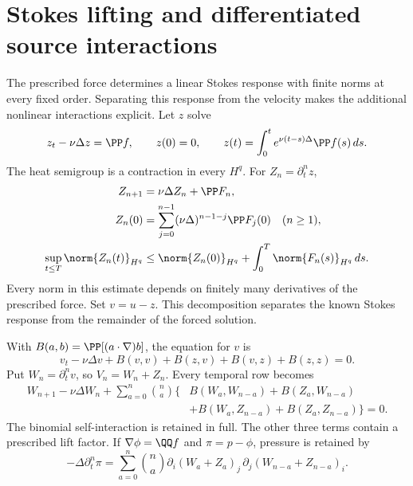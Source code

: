 \section{Stokes lifting and differentiated source interactions}\label{r:joined-sec:unrestricted}

The prescribed force determines a linear Stokes response with
finite norms at every fixed order. Separating this response from the
velocity makes the additional nonlinear interactions explicit.
Let $z$ solve
\begin{equation}\label{r:joined-eq:stokeslift}
z_t-\nu\Delta z=\PP f,\qquad z(0)=0,
\qquad z(t)=\int_0^t e^{\nu(t-s)\Delta}\PP f(s)\,ds.
\end{equation}
The heat semigroup is a contraction in every $H^q$. For $Z_n=\partial_t^nz$,
\begin{equation}\label{r:joined-eq:liftjets}
\begin{aligned}
Z_{n+1}&=\nu\Delta Z_n+\PP F_n,\\
Z_n(0)&=\sum_{j=0}^{n-1}(\nu\Delta)^{n-1-j}\PP F_j(0)
\quad(n\ge1),\\
\sup_{t\le T}\norm{Z_n(t)}_{H^q}
&\le\norm{Z_n(0)}_{H^q}+\int_0^T\norm{F_n(s)}_{H^q}\,ds.
\end{aligned}
\end{equation}
Every norm in this estimate depends on finitely many derivatives of
the prescribed force. Set \(v=u-z\). This decomposition separates the
known Stokes response from the remainder of the forced solution.

With $B(a,b)=\PP[(a\cdot\nabla)b]$, the equation for $v$ is
\begin{equation}\label{r:joined-eq:liftequation}
v_t-\nu\Delta v+B(v,v)+B(z,v)+B(v,z)+B(z,z)=0.
\end{equation}
Put $W_n=\partial_t^nv$, so $V_n=W_n+Z_n$. Every temporal row becomes
\begin{equation}\label{r:joined-eq:liftrow}
\begin{aligned}
W_{n+1}-\nu\Delta W_n
+\sum_{a=0}^n\binom na\bigl\{
&B(W_a,W_{n-a})+B(Z_a,W_{n-a})\\
&+B(W_a,Z_{n-a})+B(Z_a,Z_{n-a})\bigr\}=0.
\end{aligned}
\end{equation}
The binomial self-interaction is retained in full. The other three terms contain a prescribed lift factor. If $\nabla\phi=\QQ f$ and $\pi=p-\phi$, pressure is retained by
\begin{equation}\label{r:joined-eq:liftpressure}
-\Delta\partial_t^n\pi
=\sum_{a=0}^n\binom na
\partial_i(W_a+Z_a)_j\,
\partial_j(W_{n-a}+Z_{n-a})_i.
\end{equation}

